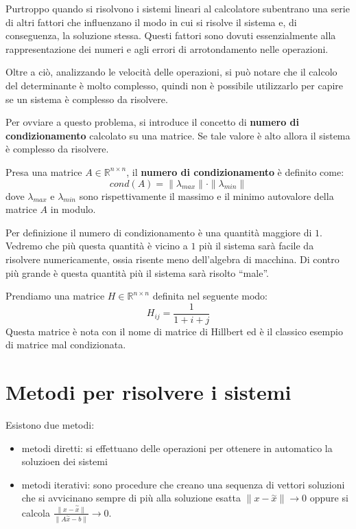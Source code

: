 Purtroppo quando si risolvono i sistemi lineari al calcolatore subentrano una
serie di altri fattori che influenzano il modo in cui si risolve il sistema e,
di conseguenza, la soluzione stessa. Questi fattori sono dovuti essenzialmente
alla rappresentazione dei numeri e agli errori di arrotondamento nelle operazioni.

Oltre a ciò, analizzando le velocità delle operazioni, si può notare che il
calcolo del determinante è molto complesso, quindi non è possibile utilizzarlo
per capire se un sistema è complesso da risolvere.

Per ovviare a questo problema, si introduce il concetto di \textbf{numero di
    condizionamento} calcolato su una matrice. Se tale valore è alto allora il
sistema è complesso da risolvere.
\begin{definizione}
    Presa una matrice $A \in \mathbb{R}^{n \times n}$, il \textbf{numero di
        condizionamento} è definito come:
    \begin{equation}
        cond(A) = \|\lambda_{max}\| \cdot \|\lambda_{min}\|
    \end{equation}
    dove $\lambda_{max}$ e $\lambda_{min}$ sono rispettivamente il massimo e il
    minimo autovalore della matrice $A$ in modulo.
\end{definizione}
Per definizione il numero di condizionamento è una quantità maggiore di $1$.
Vedremo che più questa quantità è vicino a $1$ più il sistema sarà facile da
risolvere numericamente, ossia risente meno dell'algebra di macchina. Di contro
più grande è questa quantità più il sistema sarà risolto “male”.
\begin{esempio}
    Prendiamo una matrice $H \in \mathbb{R}^{n \times n}$ definita nel seguente modo:
    \begin{equation*}
        H_{ij}=\frac{1}{1+i+j}
    \end{equation*}
    Questa matrice è nota con il nome di matrice di Hillbert ed è il classico
    esempio di matrice mal condizionata. 
\end{esempio}

\section{Metodi per risolvere i sistemi}
Esistono due metodi:
\begin{itemize}
    \item metodi diretti: si effettuano delle operazioni per ottenere in automatico
    la soluzioen dei sistemi
    \item metodi iterativi: sono procedure che creano una sequenza di vettori soluzioni
    che si avvicinano sempre di più alla soluzione esatta $\|x -\stackrel{\sim}{x}\|\rightarrow 0$
    oppure si calcola $\frac{\|x -\stackrel{\sim}{x}\|}{\|A\stackrel{\sim}{x} - b\|}\rightarrow 0$.
\end{itemize}

